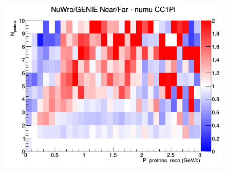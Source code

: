 \begin{figure}[h]
\endminipage
{}
\includegraphics[width=\linewidth]{eff_N_P/GAr/protons/ratios/CC1Pi_NuWro_GENIE_numu_NF_N_P.png}
\endminipage
\newline
\end{figure}
\clearpage
